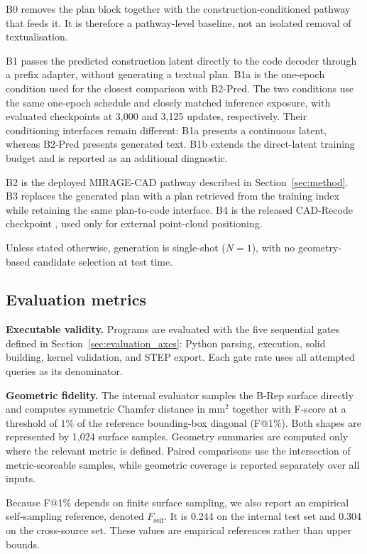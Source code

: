 \documentclass[preprint,12pt]{elsarticle}
\begin{document}
B0 removes the plan block together with the construction-conditioned pathway
that feeds it. It is therefore a pathway-level baseline, not an isolated
removal of textualisation.

B1 passes the predicted construction latent directly to the code decoder
through a prefix adapter, without generating a textual plan. B1a is the
one-epoch condition used for the closest comparison with B2-Pred. The two
conditions use the same one-epoch schedule and closely matched inference
exposure, with evaluated checkpoints at 3,000 and 3,125 updates,
respectively. Their conditioning interfaces remain different: B1a presents a
continuous latent, whereas B2-Pred presents generated text. B1b extends the
direct-latent training budget and is reported as an additional diagnostic.

B2 is the deployed MIRAGE-CAD pathway described in
Section~\ref{sec:method}. B3 replaces the generated plan with a plan retrieved
from the training index while retaining the same plan-to-code interface. B4 is
the released CAD-Recode checkpoint
\cite{rukhovich2025cadrecode}, used only for external point-cloud positioning.

Unless stated otherwise, generation is single-shot ($N=1$), with no
geometry-based candidate selection at test time.


\subsection{Evaluation metrics}
\label{sec:eval_protocols}

\textbf{Executable validity.}
Programs are evaluated with the five sequential gates defined in
Section~\ref{sec:evaluation_axes}: Python parsing, execution, solid building,
kernel validation, and STEP export. Each gate rate uses all attempted queries
as its denominator.

\textbf{Geometric fidelity.}
The internal evaluator samples the B-Rep surface directly and computes
symmetric Chamfer distance in mm$^2$ together with F-score at a threshold of
$1\%$ of the reference bounding-box diagonal (F@1\%). Both shapes are
represented by 1,024 surface samples. Geometry summaries are computed only
where the relevant metric is defined. Paired comparisons use the intersection
of metric-scoreable samples, while geometric coverage is reported separately
over all inputs.

Because F@1\% depends on finite surface sampling, we also report an empirical
self-sampling reference, denoted $F_{\mathrm{self}}$. It is 0.244 on the
internal test set and 0.304 on the cross-source set. These values are empirical
references rather than upper bounds.
\end{document}
